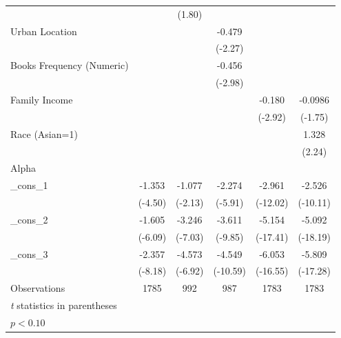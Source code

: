 {\begin{longtable}{l*{5}{c}}
                    &                   &      (1.80)       &                   &                   &                   \\
Urban Location      &                   &                   &      -0.479\sym{*}&                   &                   \\
                    &                   &                   &     (-2.27)       &                   &                   \\
Books Frequency (Numeric)&                   &                   &      -0.456\sym{*}&                   &                   \\
                    &                   &                   &     (-2.98)       &                   &                   \\
Family Income       &                   &                   &                   &      -0.180\sym{*}&     -0.0986\sym{*}\\
                    &                   &                   &                   &     (-2.92)       &     (-1.75)       \\
Race (Asian=1)      &                   &                   &                   &                   &       1.328\sym{*}\\
                    &                   &                   &                   &                   &      (2.24)       \\
\midrule
Alpha               &                   &                   &                   &                   &                   \\
\_cons\_1             &      -1.353\sym{*}&      -1.077\sym{*}&      -2.274\sym{*}&      -2.961\sym{*}&      -2.526\sym{*}\\
                    &     (-4.50)       &     (-2.13)       &     (-5.91)       &    (-12.02)       &    (-10.11)       \\
\_cons\_2             &      -1.605\sym{*}&      -3.246\sym{*}&      -3.611\sym{*}&      -5.154\sym{*}&      -5.092\sym{*}\\
                    &     (-6.09)       &     (-7.03)       &     (-9.85)       &    (-17.41)       &    (-18.19)       \\
\_cons\_3             &      -2.357\sym{*}&      -4.573\sym{*}&      -4.549\sym{*}&      -6.053\sym{*}&      -5.809\sym{*}\\
                    &     (-8.18)       &     (-6.92)       &    (-10.59)       &    (-16.55)       &    (-17.28)       \\
\midrule
Observations        &        1785       &         992       &         987       &        1783       &        1783       \\
\bottomrule
\multicolumn{6}{l}{\footnotesize \textit{t} statistics in parentheses}\\
\multicolumn{6}{l}{\footnotesize \sym{*} \(p<0.10\)}\\
\end{longtable}
}
